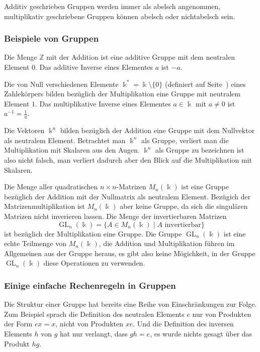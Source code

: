 Additiv geschrieben Gruppen werden immer als abelsch angenommen,
multiplikativ geschriebene Gruppen können abelsch oder nichtabelsch sein.

\subsubsection{Beispiele von Gruppen}

\begin{beispiel}
Die Menge $\mathbb{Z}$ mit der Addition ist eine additive Gruppe mit
dem neutralen Element $0$.
Das additive Inverse eines Elementes $a$ ist $-a$.
\end{beispiel}

\begin{beispiel}
Die von Null verschiedenen Elemente $\Bbbk^*=\Bbbk\setminus\{0\}$ (definiert
auf Seite~\pageref{buch:zahlen:def:bbbk*})
eines Zahlekörpers bilden
bezüglich der Multiplikation eine Gruppe mit neutralem Element $1$.
Das multiplikative Inverse eines Elementes $a\in \Bbbk$ mit $a\ne 0$
ist $a^{-1}=\frac1{a}$.
\end{beispiel}

\begin{beispiel}
Die Vektoren $\Bbbk^n$ bilden bezüglich der Addition eine Gruppe mit
dem Nullvektor als neutralem Element.
Betrachtet man $\Bbbk^n$ als Gruppe, verliert man die Multiplikation
mit Skalaren aus den Augen.
$\Bbbk^n$ als Gruppe zu bezeichnen ist also nicht falsch, man
verliert dadurch aber den Blick auf die Multiplikation mit Skalaren.
\end{beispiel}

\begin{beispiel}
Die Menge aller quadratischen $n\times n$-Matrizen $M_n(\Bbbk)$ ist
eine Gruppe bezüglich der Addition mit der Nullmatrix als neutralem
Element.
Bezügich der Matrizenmultiplikation ist $M_n(\Bbbk)$ aber keine
Gruppe, da sich die singulären Matrizen nicht inverieren lassen.
Die Menge der invertierbaren Matrizen
\[
\operatorname{GL}_n(\Bbbk)
=
\{
A\in M_n(\Bbbk)\;|\; \text{$A$ invertierbar}
\}
\]
ist bezüglich der Multiplikation eine Gruppe.
Die Gruppe $\operatorname{GL}_n(\Bbbk)$ ist eine echte Teilmenge 
von $M_n(\Bbbk)$, die Addition und Multiplikation führen im Allgemeinen
aus der Gruppe heraus, es gibt also keine Mögichkeit, in der Gruppe
$\operatorname{GL}_n(\Bbbk)$ diese Operationen zu verwenden.
\end{beispiel}

\subsubsection{Einige einfache Rechenregeln in Gruppen}
Die Struktur einer Gruppe hat bereits eine Reihe von
Einschränkungen zur Folge.
Zum Beispiel sprach die Definition des neutralen Elements $e$ nur von
Produkten der Form $ex=x$, nicht von Produkten $xe$.
Und die Definition des inversen Elements $h$ von $g$ hat nur
verlangt, dass $gh=e$, es wurde nichts gesagt über das Produkt $hg$.

